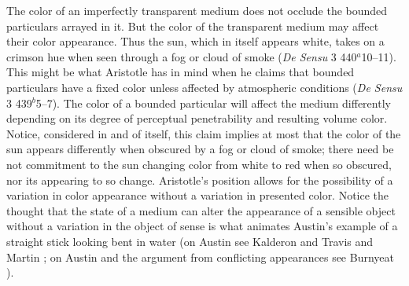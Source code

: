 \documentclass[12pt]{article}
\begin{document}
The color of an imperfectly transparent medium does not occlude the bound\-ed particulars arrayed in it. But the color of the transparent medium may affect their color appearance. Thus the sun, which in itself appears white, takes on a crimson hue when seen through a fog or cloud of smoke (\emph{De Sensu} 3 440\( ^{a} \)10--11). This might be what Aristotle has in mind when he claims that bounded particulars have a fixed color unless affected by atmospheric conditions (\emph{De Sensu} 3 439\( ^{b} \)5--7). The color of a bounded particular will affect the medium differently depending on its degree of perceptual penetrability and resulting volume color. Notice, considered in and of itself, this claim implies at most that the color of the sun appears differently when obscured by a fog or cloud of smoke; there need be not commitment to the sun changing color from white to red when so obscured, nor its appearing to so change. Aristotle's position allows for the possibility of a variation in color appearance without a variation in presented color. Notice the thought that the state of a medium can alter the appearance of a sensible object without a variation in the object of sense is what animates Austin's \citeyearpar{Austin:1962lr} example of a straight stick looking bent in water (on Austin see Kalderon and Travis \citeyear{Kalderon:2010fk} and Martin \citeyear{Martin:2000nx}; on Austin and the argument from conflicting appearances see Burnyeat \citeyear{Burnyeat:1979mv}).
\end{document}

